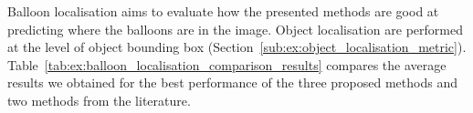 


Balloon localisation aims to evaluate how the presented methods are good at predicting where the balloons are in the image.
Object localisation are performed at the level of object bounding box (Section~\ref{sub:ex:object_localisation_metric}).
Table~\ref{tab:ex:balloon_localisation_comparison_results} compares the average results we obtained for the best performance of the three proposed methods and two methods from the literature.

